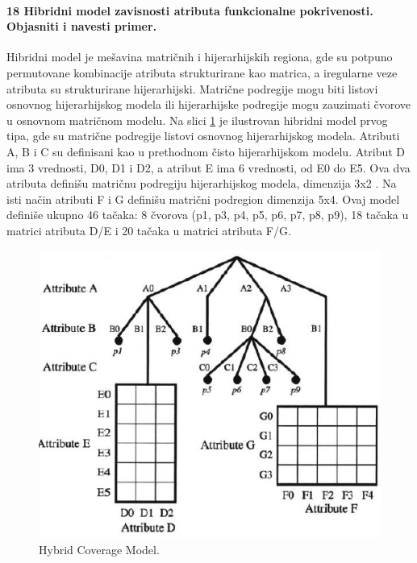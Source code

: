 \documentclass[a4paper, 12pt]{article}
\begin{document}
\paragraph{18 Hibridni model zavisnosti atributa funkcionalne pokrivenosti. Objasniti i navesti primer.}
\hfill \break
\indent Hibridni model je mešavina matričnih i hijerarhijskih regiona, gde su potpuno permutovane kombinacije atributa strukturirane kao matrica, a iregularne veze atributa su strukturirane hijerarhijski. Matrične podregije mogu biti listovi osnovnog hijerarhijskog modela ili hijerarhijske podregije mogu zauzimati čvorove u osnovnom matričnom modelu. Na slici \ref{img-hybrid-coverage-model} je ilustrovan hibridni model prvog tipa, gde su matrične podregije listovi osnovnog hijerarhijskog modela. Atributi A, B i C su definisani kao u prethodnom čisto hijerarhijskom modelu. Atribut D ima 3 vrednosti, D0, D1 i D2, a atribut E ima 6 vrednosti, od E0 do E5. Ova dva atributa definišu matričnu podregiju hijerarhijskog modela, dimenzija 3x2 . Na isti način atributi F i G definišu matrični podregion dimenzija 5x4. Ovaj model definiše ukupno 46 tačaka: 8 čvorova (p1, p3, p4, p5, p6, p7, p8, p9), 18 tačaka u matrici atributa  D/E i 20 tačaka u matrici atributa F/G.
\begin{figure}[h!]
\centering
\includegraphics[scale=0.6]{img-hybrid-coverage-model.png}
\caption{Hybrid Coverage Model.}
\label{img-hybrid-coverage-model}
\end{figure}
\end{document}
